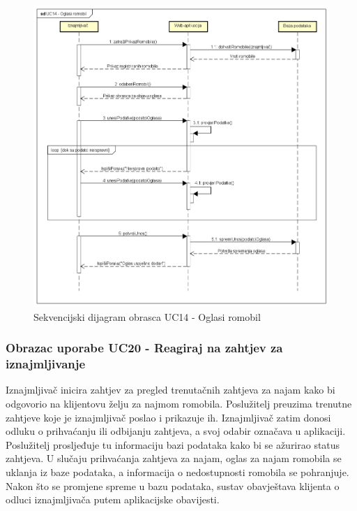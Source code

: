 						\begin{figure} [H]
							
							\includegraphics[width=1\linewidth]{dijagrami/UC14 - Oglasi romobil.png}
							\centering
							\caption{Sekvencijski dijagram obrasca UC14 - Oglasi romobil}
							\label{fig:Sekvencijski dijagram obrasca UC14 - Oglasi romobil}
						\end{figure}
						
				\eject

				\subsubsection{Obrazac uporabe UC20 - Reagiraj na zahtjev za iznajmljivanje}
				Iznajmljivač inicira zahtjev za pregled trenutačnih zahtjeva za najam kako bi odgovorio na klijentovu želju za najmom romobila. Poslužitelj preuzima trenutne zahtjeve koje je iznajmljivač poslao i prikazuje ih. Iznajmljivač zatim donosi odluku o prihvaćanju ili odbijanju zahtjeva, a svoj odabir označava u aplikaciji. Poslužitelj prosljeđuje tu informaciju bazi podataka kako bi se ažurirao status zahtjeva. U slučaju prihvaćanja zahtjeva za najam, oglas za najam romobila se uklanja iz baze podataka, a informacija o nedostupnosti romobila se pohranjuje. Nakon što se promjene spreme u bazu podataka, sustav obavještava klijenta o odluci iznajmljivača putem aplikacijske obavijesti.
				
